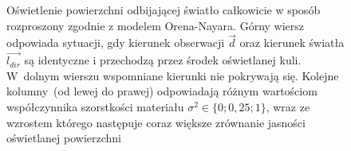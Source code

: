 \begin{figure}[H]
\centering
{}


\caption[Oświetlenie powierzchni odbijającej światło całkowicie w sposób rozproszony zgodnie z modelem Orena-Nayara]{Oświetlenie powierzchni odbijającej światło całkowicie w sposób rozproszony zgodnie z modelem Orena-Nayara. Górny wiersz odpowiada sytuacji, gdy kierunek obserwacji $\vec{d}$ oraz kierunek światła $\overrightarrow{l_{dir}}$ są identyczne i przechodzą przez środek oświetlanej kuli. W~dolnym wierszu wspomniane kierunki nie pokrywają się. Kolejne kolumny~(od lewej do prawej) odpowiadają różnym wartościom współczynnika szorstkości materiału $\sigma^2\in\lbrace 0; 0,25; 1 \rbrace$, wraz ze wzrostem którego następuje coraz większe zrównanie jasności oświetlanej powierzchni}
\label{ch3:img:diffuse_params}
\end{figure}